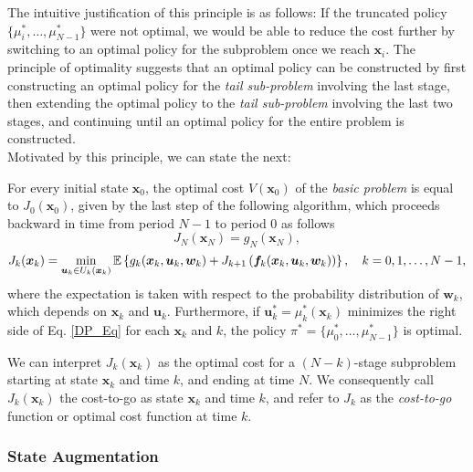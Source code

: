 The intuitive justification of this principle is as follows: If the truncated 
policy $\{\mu_i^*,\dots,\mu^*_{N-1}\}$ were not optimal, we would be 
able to reduce the cost further by switching to an optimal policy for the subproblem 
once we reach $\bm{x}_i$. The principle of optimality suggests that an optimal policy 
can be constructed by first constructing an optimal policy for the 
\textit{tail sub-problem} involving the last stage, then extending the optimal 
policy to the \textit{tail sub-problem} involving the last two stages, and 
continuing until an optimal policy for the entire problem is constructed.\\

Motivated by this principle, we can state the next:

\begin{proposition}
For every initial state $\bm{x}_0$, the optimal cost $V(\bm{x}_0)$ of the \textit{basic problem} is equal to $J_0(\bm{x}_0)$, given by the last step of the following algorithm, which proceeds backward in time from period $N-1$ to period $0$ as follows
\begin{equation*}
J_N(\bm{x}_N)=g_N(\bm{x}_N),
\end{equation*}
\begin{equation}
J_k(\bm{x}_k)=\min_{\bm{u}_k\in U_k(\bm{x}_k)}\mathbb{E}\left\{g_k(\bm{x}_k,\bm{u}_k,\bm{w}_k)+J_{k+1}\left(\bm{f}_k(\bm{x}_k,\bm{u}_k,\bm{w}_k)\right)\right\},\quad k=0,1,\dots,N-1,
\label{DP_Eq}
\end{equation}
where the expectation is taken with respect to the probability distribution 
of $\bm{w}_k$, which depends on $\bm{x}_k$ and $\bm{u}_k$. Furthermore, if
 $\bm{u}_k^*=\mu_k^*(\bm{x}_k)$ minimizes the right side of Eq. \ref{DP_Eq} 
 for each $\bm{x}_k$ and $k$, the policy $\pi^*=\{\mu_0^*,\dots,\mu^*_{N-1}\}$ is optimal.
\end{proposition}
We can interpret $J_k(\bm{x}_k)$ as the optimal cost for a $(N-k)$-stage 
subproblem starting at state $\bm{x}_k$ and time $k$, and ending at time 
$N$. We consequently call $J_k(\bm{x}_k)$ the cost-to-go as state $\bm{x}_k$ 
and time $k$, and refer to $J_k$ as the \textit{cost-to-go} function or optimal 
cost function at time $k$.

\subsubsection{State Augmentation} \label{Subsection_SA}

